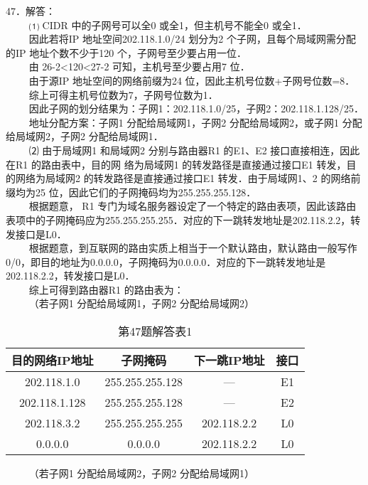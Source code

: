 47．解答： \\
$\qquad$ ⑴ CIDR 中的子网号可以全0 或全1，但主机号不能全0 或全1． \\
$\qquad$ 因此若将IP 地址空间202.118.1.0/24 划分为2 个子网，且每个局域网需分配的IP 地址个数不少于120 个，子网号至少要占用一位． \\
$\qquad$ 由 26-2<120<27-2 可知，主机号至少要占用7 位． \\
$\qquad$ 由于源IP 地址空间的网络前缀为24 位，因此主机号位数+子网号位数=8． \\
$\qquad$ 综上可得主机号位数为7，子网号位数为1． \\
$\qquad$ 因此子网的划分结果为：子网1：202.118.1.0/25，子网2：202.118.1.128/25． \\
$\qquad$ 地址分配方案：子网1 分配给局域网1，子网2 分配给局域网2，或子网1 分配给局域网2，子网2 分配给局域网1． \\
$\qquad$ ⑵ 由于局域网1 和局域网2 分别与路由器R1 的E1、E2 接口直接相连，因此在R1 的路由表中，目的网
络为局域网1 的转发路径是直接通过接口E1 转发，目的网络为局域网2 的转发路径是直接通过接口E1 转发．由于局域网1、2 的网络前缀均为25 位，因此它们的子网掩码均为255.255.255.128． \\
$\qquad$ 根据题意， R1 专门为域名服务器设定了一个特定的路由表项，因此该路由表项中的子网掩码应为255.255.255.255．对应的下一跳转发地址是202.118.2.2，转发接口是L0．  \\
$\qquad$ 根据题意，到互联网的路由实质上相当于一个默认路由，默认路由一般写作0/0，即目的地址为0.0.0.0，子网掩码为0.0.0.0．对应的下一跳转发地址是202.118.2.2，转发接口是L0． \\
$\qquad$ 综上可得到路由器R1 的路由表为： \\
$\qquad$ （若子网1 分配给局域网1，子网2 分配给局域网2）
\begin{table}[ht]
\centering
\caption{第47题解答表1}\label{CSN09_tab8}
\begin{tabular}{|c|c|c|c|}
\hline
目的网络IP地址 & 子网掩码 & 下一跳IP地址 & 接口 \\
\hline
202.118.1.0 & 255.255.255.128 & — & E1 \\
\hline
202.118.1.128 & 255.255.255.128 & — & E2 \\
\hline
202.118.3.2 & 255.255.255.255 & 202.118.2.2 & L0 \\
\hline
0.0.0.0 & 0.0.0.0 & 202.118.2.2 & L0 \\
\hline
\end{tabular}
\end{table}
$\qquad$ （若子网1 分配给局域网2，子网2 分配给局域网1） \\
